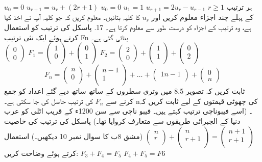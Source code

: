 \(u_{0}=0\) 
\(u_{r+1}=u_{r}+(2r+1)\)
\(u_{0}=0\)
\(u_{1}=1\)
\(u_{r+1}=2u_{r}-u_{r-1}\)
\(r\ge 1\)
ہر ترتیب کے پہلے چند اجزاء معلوم کریں اور
\(u_{r}\)
 کا کلیہ بتائیں۔ معلوم کریں کہ جو کلیہ آپ نے اخذ کیا ہے، وہ ترتیب کے اجزاء کو درست طور سے معلوم کرتا ہے۔
17.	پاسکل کی ترتیب کو استعمال کرتے ہوئے ایک نئی ترتیب Fn بنائی گئی ہے۔\\
\(
\begin{pmatrix}
0\\
0
\end{pmatrix}\)
\(F_{1}=
\begin{pmatrix}
1\\
0\\
\end{pmatrix}
+
\begin{pmatrix}
0\\
1\\
\end{pmatrix}\)
\(F_{2}=
\begin{pmatrix}
2\\
0
\end{pmatrix}
+
\begin{pmatrix}
1\\
1\\
\end{pmatrix}
+
\begin{pmatrix}
0\\
2\\
\end{pmatrix}\)
\[F_{n}=
\begin{pmatrix}
n\\
0\\

\end{pmatrix}
+
\begin{pmatrix}
n-1\\
1\\
\end{pmatrix}
+\dotsc +
\begin{pmatrix}
1
n-1\\
\end{pmatrix}
+
\begin{pmatrix}
0\\
n
\end{pmatrix}\] 
ثابت کریں کہ تصویر 8.5 میں وتری سطروں کے ساتھ ساتھ دیے گئے اعداد کو جمع کرنے سے
 \(F_{n}\)
  کی ترتیب حاصل کی جا سکتی ہے۔ nکی چھوٹی قیمتوں کے لیے ثابت کریں کہ 	۔ (اسے فیبوناچی ترتیب کہتے ہیں۔ فیبو ناچی سے سن 1200ء کے قریب اٹلی کو عرب دنیا کے الجبرائی طریقوں سے متعارف کروایا تھا۔)
پاسکل کی ترتیب کی خاصیت 
\(
\begin{pmatrix}
n\\
r\\
\end{pmatrix}
+
\begin{pmatrix}
n\\
r+1\\
\end{pmatrix}
=
\begin{pmatrix}
n+1\\
r+1\\
\end{pmatrix}\)
(مشق 8ب کا سوال نمبر 10 دیکھیں۔) استعمال کرتے ہوئے وضاحت کریں:
\(F_{3}+F_{4}=F_{5}\)
\(F_{4}+F_{5}=F{6}\)

